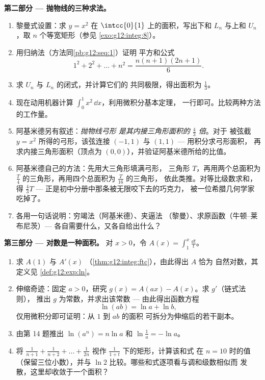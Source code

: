 \begin{problem}
\medskip
\noindent\textbf{第二部分 --- 抛物线的三种求法。}
\begin{enumerate}[resume]
  \item 黎曼式设置：求 $y = x^2$ 在
        $\intcc{0}{1}$ 上的面积，写出下和 $L_n$ 与上和
        $U_n$，取 $n$ 个等宽矩形（参见
        \cref{exo:g12:integ:8}）。
  \item 用归纳法（方法同\cref{pb:g12:seq:1}）证明
        平方和公式
        \[
        1^2 + 2^2 + \dots + n^2 = \frac{n(n+1)(2n+1)}{6} .
        \]
  \item 求 $U_n$ 与 $L_n$ 的闭式，并计算它们的
        共同极限，得出面积为 $\frac13$。
  \item 现在动用机器计算
        $\int_0^1 x^2\,\dd x$，利用微积分基本定理，
        一行即可。比较两种方法的工作量。
  \item 阿基米德另有叙述：\emph{抛物线弓形
        是其内接三角形面积的 $\frac43$ 倍}。对于
        被弦截 $y = x^2$ 所得的弓形，该弦连接
        $(-1, 1)$ 与 $(1, 1)$ --- 用积分求弓形面积，
        再求内接三角形面积（顶点为
        $(0, 0)$），并验证阿基米德所给的比值。
  \item 阿基米德自己的方法：先用大三角形填满弓形，
        三角形 $T$，再用两个总面积为
        $\frac T4$ 的三角形，再用四个总面积为 $\frac{T}{16}$ 的三角形，
        依此类推。对等比级数求和，
        得 $\frac43 T$ --- 正是初中分册中那条被无限咬下去的巧克力，
        被一位希腊几何学家吃掉了。
  \item 各用一句话说明：穷竭法（阿基米德）、夹逼法
        （黎曼）、求原函数（牛顿--莱布尼茨）---
        各自需要什么，又各自给出什么？
\end{enumerate}

\medskip
\noindent\textbf{第三部分 --- 对数是一种面积。}
对 $x > 0$，令
$A(x) = \displaystyle\int_1^x \frac{\dd t}{t}$。
\begin{enumerate}[resume]
  \item 求 $A(1)$ 与 $A'(x)$
        （\cref{thm:g12:integ:ftc}），由此得出 $A$ 恰为
        自然对数，其定义见
        \cref{def:g12:exp:ln}。
  \item 伸缩奇迹：固定 $a > 0$，研究
        $g(x) = A(ax) - A(x)$。求 $g'$（链式法则），
        推出 $g$ 为常数，并求出该常数 ---
        由此得出函数方程
        \[
        \ln(ab) = \ln a + \ln b ,
        \]
        仅用微积分即可证明：从 $1$ 到 $ab$ 的面积
        可拆分为伸缩后的若干副本。
  \item 由第 14 题推出 $\ln(a^n) = n\ln a$ 和
        $\ln\frac1a = -\ln a$。
  \item {} 将
        $\frac{1}{n+1} + \frac{1}{n+2} + \dots + \frac{1}{2n}$
        视作 $\frac{1}{1 + t}$ 下的矩形，计算该和式
        在 $n = 10$ 时的值（保留三位小数），并与
        $\ln 2$ 比较。哪些和式逐项看与调和级数相似而
        发散，这里却收敛于一个面积？
\end{enumerate}


\end{problem}
